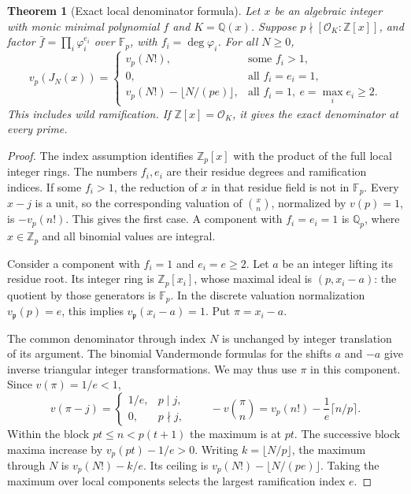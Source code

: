 \documentclass[11pt,a4paper]{article}
\newtheorem{theorem}{Theorem}[section]
\theoremstyle{definition}
\theoremstyle{remark}
\theoremstyle{plain}
\numberwithin{equation}{section}
\begin{document}
\begin{theorem}[Exact local denominator formula]\label{sc:thm:local-full}
Let $x$ be an algebraic integer with monic minimal polynomial $f$
and $K=\mathbb Q(x)$.  Suppose $p\nmid[\mathcal O_K:\mathbb Z[x]]$,
and factor
$\bar f=\prod_i\varphi_i^{e_i}$ over $\mathbb F_p$, with
$f_i=\deg\varphi_i$.  For all $N\ge0$,
\[
v_p(J_N(x))=
\begin{cases}
 v_p(N!),&\text{some }f_i>1,\\
 0,&\text{all }f_i=e_i=1,\\
 v_p(N!)-\lfloor N/(pe)\rfloor,
 &\text{all }f_i=1,\ e=\max_i e_i\ge2.
\end{cases}
\]
This includes wild ramification.  If $\mathbb Z[x]=\mathcal O_K$,
it gives the exact denominator at every prime.
\end{theorem}
\begin{proof}
The index assumption identifies $\mathbb Z_p[x]$ with the product
of the full local integer rings.  The numbers $f_i,e_i$ are their
residue degrees and ramification indices.  If some $f_i>1$, the
reduction of $x$ in that residue field is not in $\mathbb F_p$.
Every $x-j$ is a unit, so the corresponding valuation of
$\binom xn$, normalized by $v(p)=1$, is $-v_p(n!)$.  This gives
the first case.  A component with $f_i=e_i=1$ is $\mathbb Q_p$,
where $x\in\mathbb Z_p$ and all binomial values are integral.

Consider a component with $f_i=1$ and $e_i=e\ge2$.  Let $a$ be
an integer lifting its residue root.  Its integer ring is
$\mathbb Z_p[x_i]$, whose maximal ideal is $(p,x_i-a)$: the
quotient by those generators is $\mathbb F_p$.  In the discrete
valuation normalization $v_{\mathfrak p}(p)=e$, this implies
$v_{\mathfrak p}(x_i-a)=1$.  Put $\pi=x_i-a$.

The common denominator through index $N$ is unchanged by integer
translation of its argument.  The binomial Vandermonde formulas
for the shifts $a$ and $-a$ give inverse triangular integer
transformations.  We may thus use $\pi$ in this component.  Since
$v(\pi)=1/e<1$,
\[
 v(\pi-j)=\begin{cases}1/e,&p\mid j,\\0,&p\nmid j,\end{cases}
 \qquad
 -v\binom\pi n=v_p(n!)-\frac1e\lceil n/p\rceil.
\]
Within the block $pt\le n<p(t+1)$ the maximum is at $pt$.
The successive block maxima increase by $v_p(pt)-1/e>0$.
Writing $k=\lfloor N/p\rfloor$, the maximum through $N$ is
$v_p(N!)-k/e$.  Its ceiling is
$v_p(N!)-\lfloor N/(pe)\rfloor$.  Taking the maximum over local
components selects the largest ramification index $e$.
\end{proof}
\end{document}
